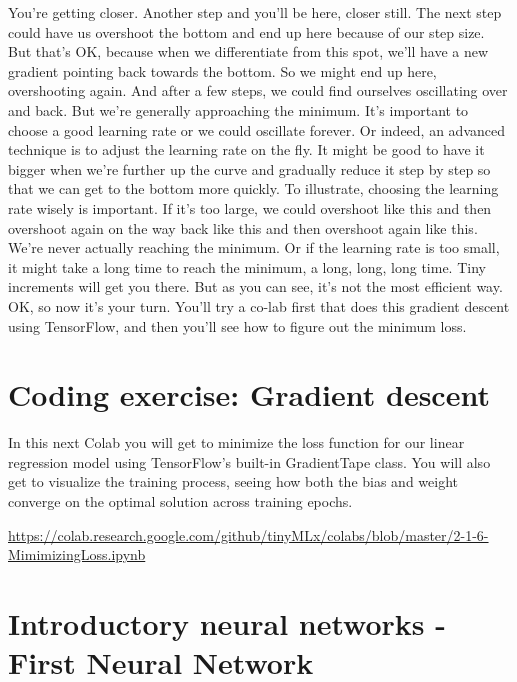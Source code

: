 You're getting closer.
Another step and you'll be here, closer still.
The next step could have us overshoot the bottom
and end up here because of our step size.
But that's OK, because when we differentiate from this spot,
we'll have a new gradient pointing back towards the bottom.
So we might end up here, overshooting again.
And after a few steps, we could find ourselves oscillating over and back.
But we're generally approaching the minimum.
It's important to choose a good learning rate or we could oscillate forever.
Or indeed, an advanced technique is to adjust the learning rate on the fly.
It might be good to have it bigger when we're further up the curve
and gradually reduce it step by step so that we can get to the bottom
more quickly.
To illustrate, choosing the learning rate wisely is important.
If it's too large, we could overshoot like this
and then overshoot again on the way back like this
and then overshoot again like this.
We're never actually reaching the minimum.
Or if the learning rate is too small, it might take a long time
to reach the minimum, a long, long, long time.
Tiny increments will get you there.
But as you can see, it's not the most efficient way.
OK, so now it's your turn.
You'll try a co-lab first that does this gradient descent using TensorFlow,
and then you'll see how to figure out the minimum loss.

\section{Coding exercise: Gradient descent}

In this next Colab you will get to minimize the loss function for our linear regression model using TensorFlow’s built-in GradientTape class. You will also get to visualize the training process, seeing how both the bias and weight converge on the optimal solution across training epochs.

\url{https://colab.research.google.com/github/tinyMLx/colabs/blob/master/2-1-6-MimimizingLoss.ipynb}


\section{Introductory neural networks - First Neural Network}

